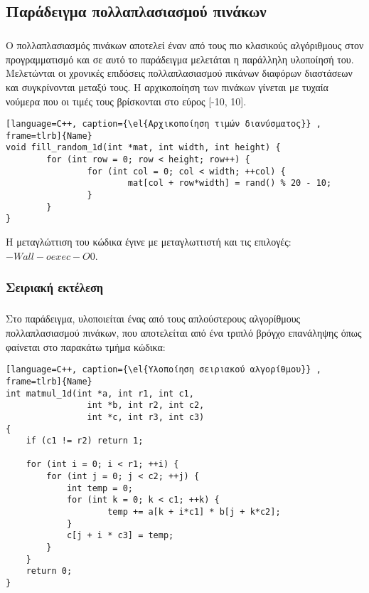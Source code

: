 \subsection{Παράδειγμα πολλαπλασιασμού πινάκων}
\subparagraph{}
Ο πολλαπλασιασμός πινάκων αποτελεί έναν από τους πιο κλασικούς αλγόριθμους στον προγραμματισμό και σε αυτό το παράδειγμα μελετάται η παράλληλη υλοποίησή του. Μελετώνται οι χρονικές επιδόσεις πολλαπλασιασμού πικάνων διαφόρων διαστάσεων και συγκρίνονται μεταξύ τους. Η αρχικοποίηση των πινάκων γίνεται με τυχαία νούμερα που οι τιμές τους βρίσκονται στο εύρος [-10, 10].

\begin{lstlisting}[language=C++, caption={\el{Αρχικοποίηση τιμών διανύσματος}} , frame=tlrb]{Name}
void fill_random_1d(int *mat, int width, int height) {
        for (int row = 0; row < height; row++) {
                for (int col = 0; col < width; ++col) {
                        mat[col + row*width] = rand() % 20 - 10;
                }
        }
}
\end{lstlisting}

Η μεταγλώττιση του κώδικα έγινε με μεταγλωττιστή \emph{} και τις επιλογές:$-Wall -o exec -O0$.

\clearpage
\subsubsection{Σειριακή εκτέλεση}
\subparagraph{}

Στο παράδειγμα, υλοποιείται ένας από τους απλούστερους αλγορίθμους πολλαπλασιασμού πινάκων, που αποτελείται από ένα τριπλό βρόγχο επανάληψης όπως φαίνεται στο παρακάτω τμήμα κώδικα:
\ \\
\begin{lstlisting}[language=C++, caption={\el{Υλοποίηση σειριακού αλγορίθμου}} , frame=tlrb]{Name}
int matmul_1d(int *a, int r1, int c1,
                int *b, int r2, int c2,
                int *c, int r3, int c3)
{
	if (c1 != r2) return 1;

    for (int i = 0; i < r1; ++i) {
		for (int j = 0; j < c2; ++j) {
        	int temp = 0;
			for (int k = 0; k < c1; ++k) {
            		temp += a[k + i*c1] * b[j + k*c2];
			}
			c[j + i * c3] = temp;
		}
	}
	return 0;
}

\end{lstlisting}

